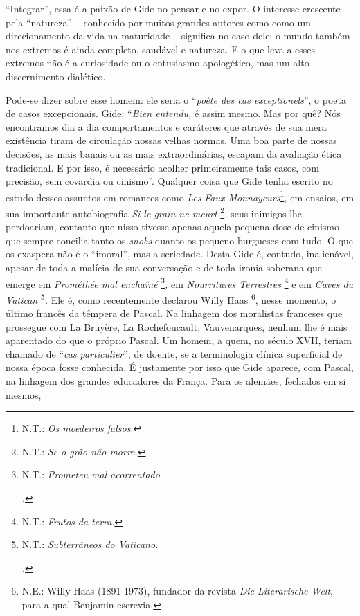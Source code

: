 ``Integrar'', essa é a paixão de Gide no pensar e no expor. O interesse
crescente pela ``natureza'' -- conhecido por muitos grandes autores como
como um direcionamento da vida na maturidade -- significa no caso dele:
o mundo também nos extremos é ainda completo, saudável e natureza. E o
que leva a esses extremos não é a curiosidade ou o entusiasmo
apologético, mas um alto discernimento dialético.

Pode-se dizer sobre esse homem: ele seria o ``\emph{poète des cas
exceptionels}'', o poeta de casos excepcionais. Gide: ``\emph{Bien
entendu,} é assim mesmo. Mas por quê? Nós encontramos dia a dia
comportamentos e caráteres que através de sua mera existência tiram de
circulação nossas velhas normas. Uma boa parte de nossas decisões, as
mais banais ou as mais extraordinárias, escapam da avaliação ética
tradicional. E por isso, é necessário acolher primeiramente tais casos,
com precisão, sem covardia ou cinismo''. Qualquer coisa que Gide tenha
escrito no estudo desses assuntos em romances como \emph{Les}
\emph{Faux-Monnayeurs}\footnote{N.T.: \emph{Os moedeiros falsos}.}\emph{,}
em ensaios, em sua importante autobiografia \emph{Si le grain ne meurt}
\footnote{N.T.: \emph{Se o grão não morre.}}\emph{,} seus inimigos lhe
perdoariam, contanto que nisso tivesse apenas aquela pequena dose de
cinismo que sempre concilia tanto os \emph{snobs} quanto os
pequeno-burgueses com tudo. O que os exaspera não é o ``imoral'', mas a
seriedade. Desta Gide é, contudo, inalienável, apesar de toda a malícia
de sua conversação e de toda ironia soberana que emerge em
\emph{Prométhée mal enchaîné} \footnote{N.T.: \emph{Prometeu mal
  acorrentado}.

  \emph{.}}\emph{,} em \emph{Nourritures Terrestres} \footnote{N.T.:
  \emph{Frutos da terra}.} e em \emph{Caves du Vatican} \footnote{N.T.:
  \emph{Subterrâneos do Vaticano.}

  \emph{.}}\emph{.} Ele é, como recentemente declarou Willy Haas
\footnote{N.E.: Willy Haas (1891-1973), fundador da revista \emph{Die
  Literarische Welt}, para a qual Benjamin escrevia.}, nesse momento, o
último francês da têmpera de Pascal. Na linhagem dos moralistas
franceses que prossegue com La Bruyère, La Rochefoucault, Vauvenarques,
nenhum lhe é mais aparentado do que o próprio Pascal. Um homem, a quem,
no século XVII, teriam chamado de ``\emph{cas particulier}'', de doente,
se a terminologia clínica superficial de nossa época fosse conhecida. É
justamente por isso que Gide aparece, com Pascal, na linhagem dos
grandes educadores da França. Para os alemães, fechados em si mesmos,
